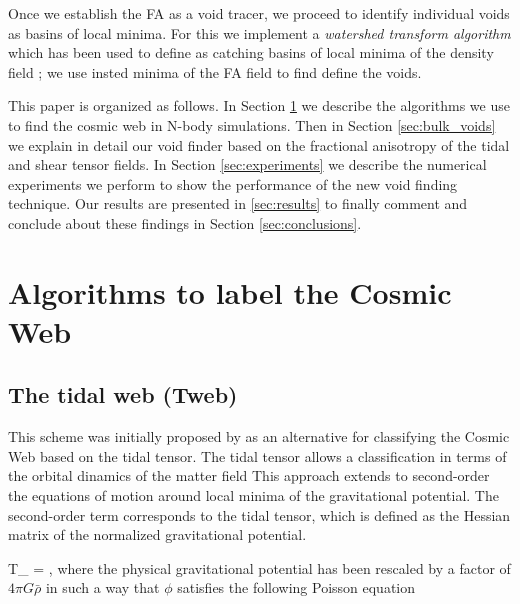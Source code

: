 \documentclass[a4,useAMS,usenatbib,usegraphicx]{latex/mn2e}
\begin{document}
Once we establish the FA as a void tracer, we proceed to
identify individual voids as basins of local minima. 
For this we implement a \textit{watershed transform algorithm}
\citep{Beucher79,Beucher93} which has been used to define as catching
basins of local minima of the density field
\citep{Platen07,Neyrinck08}; we use insted minima of the FA field to
find define the voids. 


This paper is organized as follows. 
In Section \ref{sec:algorithms_cosmic_web} we describe the algorithms
we use to find the cosmic web in N-body simulations. 
Then in Section \ref{sec:bulk_voids} we explain in detail our void
finder based on the fractional anisotropy of the tidal and shear
tensor fields. 
In Section \ref{sec:experiments} we describe the numerical experiments
we perform to show the performance of the new void finding technique.  
Our results are presented in \ref{sec:results} to finally comment and
conclude about these findings in Section \ref{sec:conclusions}. 


\section{Algorithms to label the Cosmic Web}
\label{sec:algorithms_cosmic_web}


\subsection{The tidal web (Tweb)}
\label{subsec:Tweb}


This scheme was initially proposed by \citet{Hahn07} as an
alternative for classifying the Cosmic Web based on the tidal tensor.
The tidal tensor allows a classification in terms of the orbital
dinamics of the matter field
This approach extends to second-order the equations of motion around 
local minima of the gravitational potential. 
The second-order term corresponds to the tidal tensor, which is
defined as the Hessian matrix of the normalized gravitational
potential.


{	T_{\alpha\beta} = ,	}
where the physical gravitational potential has been rescaled by a
factor of   $4\pi G\bar{\rho}$ in such a way that $\phi$ satisfies the following 
Poisson equation
\end{document}
